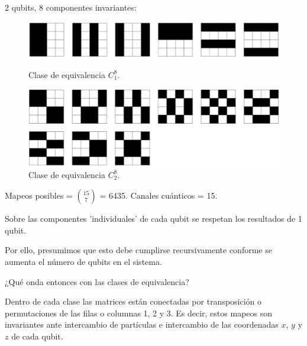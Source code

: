 \documentclass[11pt]{beamer}
\begin{document}
\begin{frame}{2 qubits, 8 componentes invariantes:}

\begin{figure}[H]
\centering
  \begin{minipage}{0.8\textwidth}
  	\centering
    \includegraphics[width=\textwidth]{img-congreso/C18.pdf}
    \caption{Clase de equivalencia $C_1^8$.}
  \end{minipage}\vfill
  \begin{minipage}{0.8\textwidth}
  	\centering
    \includegraphics[width=\textwidth]{img-congreso/C28.pdf}
    \caption{Clase de equivalencia $C_2^8$.}
  \end{minipage}
\end{figure}
Mapeos posibles = $15 \choose 7$ = 6435. Canales cuánticos = 15.

\end{frame}

\begin{frame}
	Sobre las componentes 'individuales' de cada qubit se respetan los
	resultados de 1 qubit. \vfill
	
	Por ello, presumimos que esto debe cumplirse recursivamente conforme
	se aumenta el número de qubits en el sistema. 
\end{frame}

\begin{frame}
	¿Qué onda entonces con las clases de equivalencia? \vfill
	
	Dentro de cada clase las matrices están conectadas por transposición o
	permutaciones de las filas o columnas 1, 2 y 3. Es decir, estos mapeos
	son invariantes ante intercambio de partículas e intercambio de las
	coordenadas $x$, $y$ y $z$ de cada qubit.
\end{frame}
\end{document}
